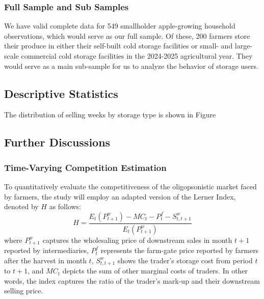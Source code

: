 \documentclass[12pt]{article}
\begin{document}
\subsubsection{Full Sample and Sub Samples}
\noindent We have valid complete data for 549 smallholder apple-growing household observations, which would serve as our full sample. Of these, 200 farmers store their produce in either their self-built cold storage facilities or small- and large-scale commercial cold storage facilities in the 2024-2025 agricultural year. They would serve as a main sub-sample for us to analyze the behavior of storage users. 


\subsection{Descriptive Statistics}
\noindent 



The distribution of selling weeks by storage type is shown in Figure







\newpage
\subsection{Further Discussions}
\subsubsection{Time-Varying Competition Estimation}
\noindent To quantitatively evaluate the competitiveness of the oligopsonistic market faced by farmers, the study will employ an adapted version of the Lerner Index, denoted by $H$ as follows:
\begin{equation}
    H = \frac{E_t(P^w_{t+1}) - MC_t - P_t^f - S_{t,t+1}^w}{E_t(P^w_{t+1})}
\end{equation}
where $P^w_{t+1}$ captures the wholesaling price of downstream sales in month $t+1$ reported by intermediaries, $P_t^f$ represents the farm-gate price reported by farmers after the harvest in month $t$, $S_{t,t+1}^w$ shows the trader's storage cost from period $t$ to $t+1$, and $MC_t$ depicts the sum of other marginal costs of traders. In other words, the index captures the ratio of the trader's mark-up and their downstream selling price. 
\end{document}
